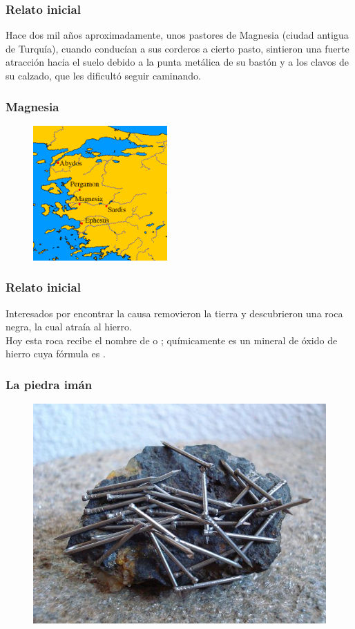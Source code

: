 \documentclass[14pt]{beamer}
\begin{document}
\begin{frame}
\frametitle{Relato inicial}
Hace dos mil años aproximadamente, unos pastores de Magnesia (ciudad antigua de Turquía), \pause cuando conducían a sus corderos a cierto pasto, sintieron una fuerte atracción hacia el suelo debido a la punta metálica de su bastón y a los clavos de su calzado, que les dificultó seguir caminando.
\end{frame}
\begin{frame}
\frametitle{Magnesia}
\begin{figure}
    \centering
    \includegraphics[scale=0.65]{Imagenes/Magnetismo_01.png}
\end{figure}
\end{frame}
\begin{frame}
\frametitle{Relato inicial}    
Interesados por encontrar la causa removieron la tierra y descubrieron una roca negra, la cual atraía al hierro.
\\
\bigskip
\pause
Hoy esta roca recibe el nombre de  o ; \pause  químicamente es un mineral de óxido de hierro cuya fórmula es .
\end{frame}
\begin{frame}
\frametitle{La piedra imán}
\begin{figure}
    \centering
    \includegraphics[scale=0.5]{Imagenes/Magnetismo_02.jpg}
\end{figure}
\end{frame}
\end{document}
